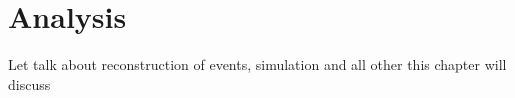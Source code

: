 \chapter{Analysis}\label{sec:analysis}

Let talk about reconstruction of events, simulation and all other this chapter will discuss

%
%



%
%
%
%
